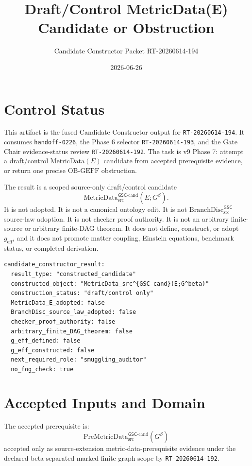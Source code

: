 \documentclass[11pt]{article}
\title{Draft/Control MetricData(E) Candidate or Obstruction}
\author{Candidate Constructor Packet RT-20260614-194}
\date{2026-06-26}
\newcommand{\PreMetricData}{\mathrm{PreMetricData}_{\mathrm{src}}^{\mathsf{GSC}\mbox{-}\mathrm{cand}}}
\newcommand{\MetricData}{\mathrm{MetricData}_{\mathrm{src}}^{\mathsf{GSC}\mbox{-}\mathrm{cand}}}
\newcommand{\BranchDisc}{\mathrm{BranchDisc}_{\mathrm{src}}^{\mathsf{GSC}}}
\newcommand{\Gbeta}{G^\beta}
\newcommand{\geff}{g_{\mathrm{eff}}}
\newcommand{\OBGEFF}{\mathrm{OB\mbox{-}GEFF}}
\begin{document}
\maketitle

\section{Control Status}

This artifact is the fused Candidate Constructor output for
\texttt{RT-20260614-194}. It consumes \texttt{handoff-0226}, the Phase 6
selector \texttt{RT-20260614-193}, and the Gate Chair evidence-status review
\texttt{RT-20260614-192}. The task is v9 Phase 7: attempt a draft/control
\(\mathrm{MetricData}(E)\) candidate from accepted prerequisite evidence, or
return one precise \(\OBGEFF\) obstruction.

The result is a scoped source-only draft/control candidate
\[
  \MetricData(E;\Gbeta).
\]
It is not adopted. It is not a canonical ontology edit. It is not
\(\BranchDisc\) source-law adoption. It is not checker proof authority. It is
not an arbitrary finite-source or arbitrary finite-DAG theorem. It does not
define, construct, or adopt \(\geff\), and it does not promote matter
coupling, Einstein equations, benchmark status, or completed derivation.

\begin{verbatim}
candidate_constructor_result:
  result_type: "constructed_candidate"
  constructed_object: "MetricData_src^{GSC-cand}(E;G^beta)"
  construction_status: "draft/control only"
  MetricData_E_adopted: false
  BranchDisc_source_law_adopted: false
  checker_proof_authority: false
  arbitrary_finite_DAG_theorem: false
  g_eff_defined: false
  g_eff_constructed: false
  next_required_role: "smuggling_auditor"
  no_fog_check: true
\end{verbatim}

\section{Accepted Inputs and Domain}

The accepted prerequisite is:
\[
  \PreMetricData(\Gbeta)
\]
accepted only as source-extension metric-data-prerequisite evidence under the
declared beta-separated marked finite graph scope by \texttt{RT-20260614-192}.
\end{document}
